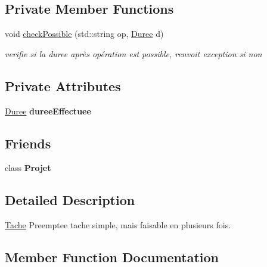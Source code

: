 \subsection*{Private Member Functions}
\begin{DoxyCompactItemize}
\item 
void \hyperlink{class_tache_unitaire_preemptee_ab3b4effe2c4d6a9bb1e63e4d177c1ef0}{check\+Possible} (std\+::string op, \hyperlink{class_duree}{Duree} d)
\begin{DoxyCompactList}\small\item\em verifie si la duree après opération est possible, renvoit exception si non \end{DoxyCompactList}\end{DoxyCompactItemize}
\subsection*{Private Attributes}
\begin{DoxyCompactItemize}
\item 
\hypertarget{class_tache_unitaire_preemptee_a73fdde2eeaff2f58445f1882aec44321}{}\hyperlink{class_duree}{Duree} {\bfseries duree\+Effectuee}\label{class_tache_unitaire_preemptee_a73fdde2eeaff2f58445f1882aec44321}

\end{DoxyCompactItemize}
\subsection*{Friends}
\begin{DoxyCompactItemize}
\item 
\hypertarget{class_tache_unitaire_preemptee_ab87b41c3faa36955cc370972f5cce344}{}class {\bfseries Projet}\label{class_tache_unitaire_preemptee_ab87b41c3faa36955cc370972f5cce344}

\end{DoxyCompactItemize}


\subsection{Detailed Description}
\hyperlink{class_tache}{Tache} Preemptee tache simple, mais faisable en plusieurs fois. 

\subsection{Member Function Documentation}
\hypertarget{class_tache_unitaire_preemptee_af30a0fd0691b514d356321a45c57661c}{}
